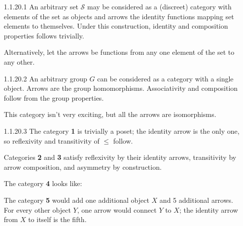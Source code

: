 \documentclass{article}
\begin{document}
\begin{enumerate}
\item[1.1.20.1]
  An arbitrary set $\mathcal{S}$ may be considered as a (discreet) category with elements of the set as objects and arrows the identity functions mapping set elements to themselves.
  Under this construction, identity and composition properties follows trivially.
  
  Alternatively, let the arrows be functions from any one element of the set to any other.

\item[]
\item[1.1.20.2]
  An arbitrary group $G$ can be considered as a category with a single object.
  Arrows are the group homomorphisms.
  Associativity and composition follow from the group properties.
  
  This category isn't very exciting, but all the arrows are isomorphisms.

\item[]
\item[1.1.20.3]
  The category \textbf{1} is trivially a poset; the identity arrow is the only one, so reflexivity and transitivity of $\le$ follow.
  
  Categories \textbf{2} and \textbf{3} satisfy reflexivity by their identity arrows, transitivity by arrow composition, and asymmetry by construction.

  The category \textbf{4} looks like:

  \begin{center}
  \end{center}

  The category \textbf{5} would add one additional object $X$ and 5 additional arrows.
  For every other object $Y$, one arrow would connect $Y$ to $X$; the identity arrow from $X$ to itself is the fifth.


\end{enumerate}
\end{document}
